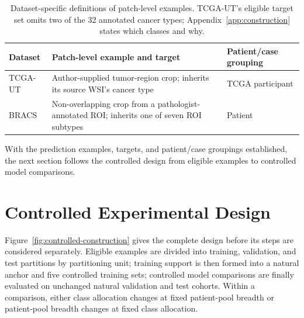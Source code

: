 \documentclass[11pt]{article}
\begin{document}
\begin{table}[ht]
  \centering
  \scriptsize
  \begin{tabularx}{\linewidth}{@{}l>{\raggedright\arraybackslash}X>{\raggedright\arraybackslash}X@{}}
    \toprule
    Dataset & Patch-level example and target & Patient/case grouping \\
    \midrule
    TCGA-UT & Author-supplied tumor-region crop; inherits its source WSI's cancer type & TCGA participant \\
    BRACS & Non-overlapping crop from a pathologist-annotated ROI; inherits one of seven ROI subtypes & Patient \\
    \bottomrule
  \end{tabularx}
  \caption{Dataset-specific definitions of patch-level examples. TCGA-UT's eligible target set omits two of the 32 annotated cancer types; Appendix~\ref{app:construction} states which classes and why.}
  \label{tab:datasets}
\end{table}

With the prediction examples, targets, and patient/case groupings established, the next section follows the controlled design from eligible examples to controlled model comparisons.

\section{Controlled Experimental Design}
\label{sec:design}
\label{sec:construction}
Figure~\ref{fig:controlled-construction} gives the complete design before its steps are considered separately. Eligible examples are divided into training, validation, and test partitions by partitioning unit; training support is then formed into a natural anchor and five controlled training sets; controlled model comparisons are finally evaluated on unchanged natural validation and test cohorts. Within a comparison, either class allocation changes at fixed patient-pool breadth or patient-pool breadth changes at fixed class allocation.
\end{document}
